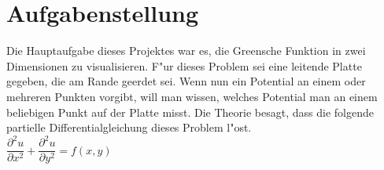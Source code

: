 \section{Aufgabenstellung}
Die Hauptaufgabe dieses Projektes war es, die Greensche Funktion in zwei Dimensionen zu visualisieren. F"ur dieses Problem sei eine leitende Platte gegeben, die am Rande geerdet sei. Wenn nun ein Potential an einem oder mehreren Punkten vorgibt, will man wissen, welches Potential man an einem beliebigen Punkt auf der Platte misst. Die Theorie besagt, dass die folgende partielle Differentialgleichung dieses Problem l"ost.\\
$\dfrac{\partial^2 u}{\partial x^2}+\dfrac{\partial^2 u}{\partial y^2} = f(x,y)$